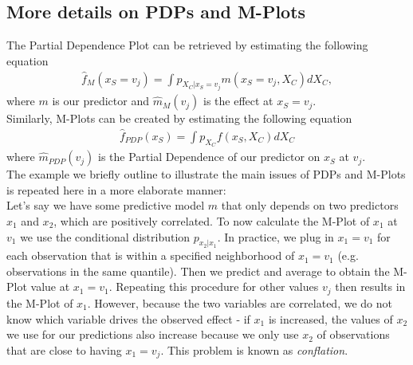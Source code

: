 \subsection{More details on PDPs and M-Plots} \label{app:m_pdp}
The Partial Dependence Plot can be retrieved by estimating the following equation
\begin{align}
\hat{f}_M(x_S=v_j)=\int p_{X_C|x_S=v_j} m(x_S=v_j, X_C)dX_C, 
\end{align}
where $m$ is our predictor and $\hat{m}_M(v_j)$ is the effect at $x_S=v_j$. \\
Similarly, M-Plots can be created by estimating the following equation
\begin{align}
    \hat{f}_{PDP}(x_S)=\int p_{X_C} f(x_S, X_C)dX_C \label{eq:pdp}
\end{align}
where $\hat{m}_{PDP}(v_j)$ is the Partial Dependence of our predictor on $x_S$ at $v_j$. \\
The example we briefly outline to illustrate the main issues of PDPs and M-Plots is repeated here in a more elaborate manner: \\
Let's say we have some predictive model $m$ that only depends on two predictors $x_1$ and $x_2$, which are positively correlated. To now calculate the M-Plot of $x_1$ at $v_1$ we use the conditional distribution $p_{x_2|x_1}$. In practice, we plug in $x_1=v_1$ for each observation that is within a specified neighborhood of $x_1=v_1$ (e.g. observations in the same quantile). Then we predict and average to obtain the M-Plot value at $x_1=v_1$. Repeating this procedure for other values $v_j$ then results in the M-Plot of $x_1$. However, because the two variables are correlated, we do not know which variable drives the observed effect - if $x_1$ is increased, the values of $x_2$  we use for our predictions also increase because we only use $x_2$ of observations that are close to having $x_1=v_j$. This problem is known as \textit{conflation}. \\

